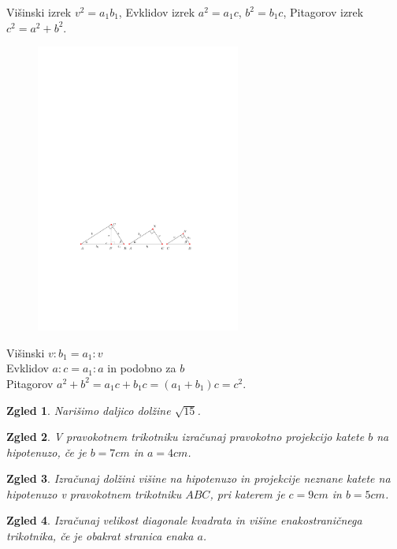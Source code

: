 \documentclass{article}
\newtheorem*{zgled}{Zgled}
\begin{document}
Višinski izrek $v^2 =a_1 b_1$, Evklidov izrek $a^2=a_1 c$, $b^2=b_1 c$, Pitagorov izrek $c^2=a^2+b^2$.
    \begin{figure}[H]
    \includegraphics[width=0.6\textwidth]{evklidov_visinski.pdf}
    \centering
    \end{figure}

Višinski $v:b_1=a_1:v$\\
Evklidov $a:c=a_1:a$ in podobno za $b$\\
Pitagorov $a^2+b^2=a_1 c+b_1 c = (a_1 +b_1) c=c^2$.



\begin{zgled}
    Narišimo daljico dolžine $\sqrt{15}$.
\end{zgled}

\begin{zgled}
    V pravokotnem trikotniku izračunaj pravokotno projekcijo katete $b$ na hipotenuzo, če je $b=7cm$ in $a=4cm$.
\end{zgled}

\begin{zgled}
    Izračunaj dolžini višine na hipotenuzo in projekcije neznane katete na hipotenuzo v pravokotnem trikotniku $ABC$, pri katerem je $c=9cm$ in $b=5cm$.
\end{zgled}

\begin{zgled}
    Izračunaj velikost diagonale kvadrata in višine enakostraničnega trikotnika, če je obakrat stranica enaka $a$.
\end{zgled}
\end{document}
